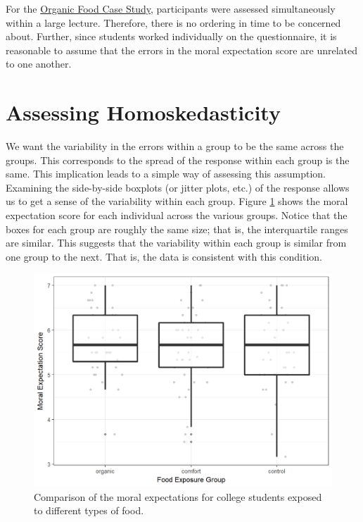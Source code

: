 \documentclass[]{book}
\theoremstyle{definition}
\theoremstyle{definition}
\theoremstyle{definition}
\theoremstyle{remark}
\begin{document}
For the \protect\hyperlink{CaseOrganic}{Organic Food Case Study},
participants were assessed simultaneously within a large lecture.
Therefore, there is no ordering in time to be concerned about. Further,
since students worked individually on the questionnaire, it is
reasonable to assume that the errors in the moral expectation score are
unrelated to one another.

\section{Assessing Homoskedasticity}\label{assessing-homoskedasticity}

We want the variability in the errors within a group to be the same
across the groups. This corresponds to the spread of the response within
each group is the same. This implication leads to a simple way of
assessing this assumption. Examining the side-by-side boxplots (or
jitter plots, etc.) of the response allows us to get a sense of the
variability within each group. Figure
\ref{fig:anovaassessment-variance-organic} shows the moral expectation
score for each individual across the various groups. Notice that the
boxes for each group are roughly the same size; that is, the
interquartile ranges are similar. This suggests that the variability
within each group is similar from one group to the next. That is, the
data is consistent with this condition.

\begin{figure}

{\centering \includegraphics[width=0.8\linewidth]{./Images/anovaassessment-variance-organic-1} 

}

\caption{Comparison of the moral expectations for college students exposed to different types of food.}\label{fig:anovaassessment-variance-organic}
\end{figure}
\end{document}
